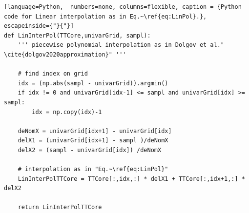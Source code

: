 \clearpage
\begin{lstlisting}[language=Python,	 numbers=none, columns=flexible, caption = {Python code for Linear interpolation as in Eq.~\ref{eq:LinPol}.}, escapeinside={"}{"}]
def LinInterPol(TTCore,univarGrid, sampl):
	''' piecewise polynomial interpolation as in Dolgov et al." \cite{dolgov2020approximation}" '''
	
	# find index on grid
	idx = (np.abs(sampl - univarGrid)).argmin()
	if idx != 0 and univarGrid[idx-1] <= sampl and univarGrid[idx] >= sampl:
		idx = np.copy(idx)-1
	
	deNomX = univarGrid[idx+1] - univarGrid[idx]
	delX1 = (univarGrid[idx+1] - sampl )/deNomX
	delX2 = (sampl - univarGrid[idx]) /deNomX
	
	# interpolation as in "Eq.~\ref{eq:LinPol}"
	LinInterPolTTCore = TTCore[:,idx,:] * delX1 + TTCore[:,idx+1,:] * delX2
	
	return LinInterPolTTCore
\end{lstlisting}
\clearpage


